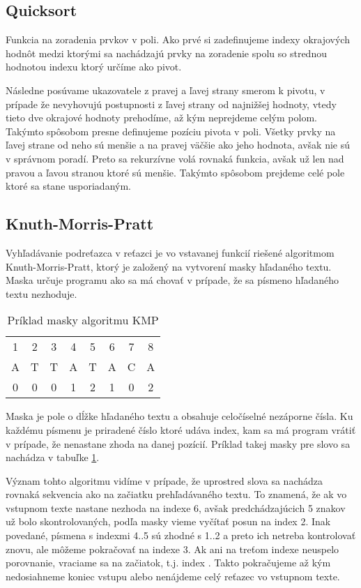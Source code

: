 \documentclass[12pt,a4paper,titlepage,final]{article}
\begin{document}
\subsection{Quicksort}
Funkcia na zoradenia prvkov v poli. Ako prvé si zadefinujeme indexy okrajových
hodnôt medzi ktorými sa nachádzajú prvky na zoradenie spolu so strednou hodnotou
indexu ktorý určíme ako pivot.

Následne posúvame ukazovatele  z pravej a ľavej strany smerom k pivotu,
 v prípade že nevyhovujú postupnosti z ľavej strany od najnižšej hodnoty, 
 vtedy tieto dve okrajové hodnoty prehodíme, až kým neprejdeme celým polom.
Takýmto spôsobom presne definujeme pozíciu pivota v poli. Všetky prvky na ľavej
 strane od neho sú menšie a na pravej väčšie ako jeho hodnota, avšak nie sú
 v správnom poradí. Preto sa rekurzívne volá rovnaká funkcia, avšak už len nad
 pravou a ľavou stranou ktoré sú menšie. Takýmto spôsobom prejdeme celé pole
 ktoré sa stane usporiadaným.

\subsection{Knuth-Morris-Pratt}
Vyhľadávanie podreťazca v reťazci je vo vstavanej funkcií riešené algoritmom
 Knuth-Morris-Pratt, ktorý je založený na vytvorení masky hľadaného textu.
Maska určuje programu ako sa má chovať v prípade, že sa písmeno hľadaného
 textu nezhoduje.
\begin{table}[H]
 \centering
 \begin{tabular}{cccccccc}
 	1 & 2 & 3 & 4 & 5 & 6 & 7 & 8 \\
 	A & T & T & A & T & A & C & A \\
 	0 & 0 & 0 & 1 & 2 & 1 & 0 & 2
 \end{tabular}
 \caption{Príklad masky algoritmu KMP}
 \label{tab:kmp}
\end{table}

Maska je pole o dĺžke hľadaného textu a obsahuje celočíselné nezáporne čísla.
Ku každému písmenu je priradené číslo ktoré udáva index, kam sa má program
 vrátiť v prípade, že nenastane zhoda na danej pozícií. Príklad takej masky
 pre slovo  sa nachádza v tabuľke \ref{tab:kmp}.

Význam tohto algoritmu vidíme v prípade, že uprostred slova sa nachádza
 rovnaká sekvencia ako na začiatku prehľadávaného textu.
To znamená, že ak vo vstupnom texte nastane nezhoda na indexe 6, avšak
 predchádzajúcich 5 znakov už bolo skontrolovaných, podľa masky vieme vyčítať
 posun na index 2. Inak povedané, písmena s indexmi 4..5 sú zhodné s 1..2
 a preto ich netreba kontrolovať znovu, ale môžeme pokračovať na indexe 3.
Ak ani na treťom indexe neuspelo porovnanie, vraciame sa na začiatok, t.j.
index . Takto pokračujeme až kým nedosiahneme koniec vstupu alebo
nenájdeme celý reťazec vo vstupnom texte.
\end{document}
